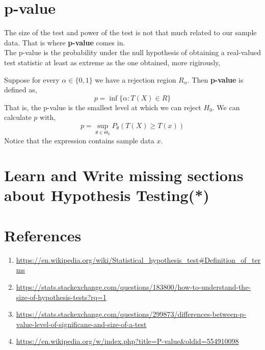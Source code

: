 \section{p-value}
The size of the test and power of the test is not that much related to our sample data. That is where \textbf{p-value} comes in. \\
The p-value is the probability under the null hypothesis of obtaining a real-valued test statistic at least as extreme as the one obtained, more rigirously,
\begin{definition}
    Suppose for every $\alpha \in \{ 0,1 \}$ we have a rejection region $R_{\alpha}$. Then \textbf{p-value} is defined as,
\[ p = \inf \biggl \{  \alpha: T(X) \in R  \biggr \} \]
That is, the p-value is the smallest level at which we can reject $H_0$. We can calculate $p$ with,
\[ p = \sup_{\theta \in \Theta_{0}} P_{\theta}( T(X) \ge T(x)) \]
Notice that the expression contains sample data $x$.
\end{definition}
\section{Learn and Write missing sections about Hypothesis Testing(*)}
\section{References}
\begin{enumerate}
    \item \url{https://en.wikipedia.org/wiki/Statistical_hypothesis_test#Definition_of_terms}
    \item \url{https://stats.stackexchange.com/questions/183800/how-to-understand-the-size-of-hypothesis-tests?rq=1}
    \item \url{https://stats.stackexchange.com/questions/299873/differences-between-p-value-level-of-significane-and-size-of-a-test}
    \item \url{https://en.wikipedia.org/w/index.php?title=P-value&oldid=554910098}
\end{enumerate}

